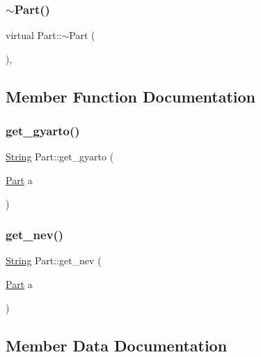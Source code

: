 \subsubsection{\texorpdfstring{$\sim$Part()}{~Part()}}
{\footnotesize\ttfamily virtual Part\+::$\sim$\+Part (\begin{DoxyParamCaption}{ }\end{DoxyParamCaption})\hspace{0.3cm}{\ttfamily [inline]}, {\ttfamily [virtual]}}



\subsection{Member Function Documentation}
\mbox{\label{class_part_aa98694c9311a297dd64cb2dff660ece2}} 
\subsubsection{\texorpdfstring{get\_gyarto()}{get\_gyarto()}}
{\footnotesize\ttfamily \mbox{\hyperlink{class_string}{String}} Part\+::get\+\_\+gyarto (\begin{DoxyParamCaption}\item[{\mbox{\hyperlink{class_part}{Part}}}]{a }\end{DoxyParamCaption})\hspace{0.3cm}{\ttfamily [inline]}}

\mbox{\label{class_part_a9412da55e41f491e3ae0fd7c3586f7fa}} 
\subsubsection{\texorpdfstring{get\_nev()}{get\_nev()}}
{\footnotesize\ttfamily \mbox{\hyperlink{class_string}{String}} Part\+::get\+\_\+nev (\begin{DoxyParamCaption}\item[{\mbox{\hyperlink{class_part}{Part}}}]{a }\end{DoxyParamCaption})\hspace{0.3cm}{\ttfamily [inline]}}



\subsection{Member Data Documentation}
\mbox{\label{class_part_ae06f2fdeb7fbbdb229a7aca151f3e341}} 
